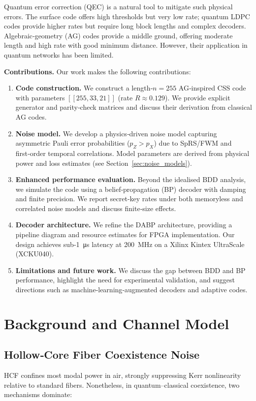 \documentclass[conference]{IEEEtran}
\begin{document}
Quantum error correction (QEC) is a natural tool to mitigate such physical errors.  The surface code offers high thresholds but very low rate; quantum LDPC codes provide higher rates but require long block lengths and complex decoders.  Algebraic‑geometry (AG) codes provide a middle ground, offering moderate length and high rate with good minimum distance.  However, their application in quantum networks has been limited.

\textbf{Contributions.} Our work makes the following contributions:

\begin{enumerate}[leftmargin=*,itemsep=1pt,topsep=2pt]
  \item \textbf{Code construction.}  We construct a length‑$n=255$ AG‑inspired CSS code with parameters $[[255,33,21]]$ (rate $R\approx 0.129$).  We provide explicit generator and parity‑check matrices and discuss their derivation from classical AG codes.
  \item \textbf{Noise model.}  We develop a physics‑driven noise model capturing asymmetric Pauli error probabilities ($p_Z>p_X$) due to SpRS/FWM and first‑order temporal correlations.  Model parameters are derived from physical power and loss estimates (see Section \ref{sec:noise_models}).
  \item \textbf{Enhanced performance evaluation.}  Beyond the idealised BDD analysis, we simulate the code using a belief‑propagation (BP) decoder with damping and finite precision.  We report secret‑key rates under both memoryless and correlated noise models and discuss finite‑size effects.
  \item \textbf{Decoder architecture.}  We refine the DABP architecture, providing a pipeline diagram and resource estimates for FPGA implementation.  Our design achieves sub‑\SI{1}{\micro\second} latency at \SI{200}{\mega\hertz} on a Xilinx Kintex UltraScale (XCKU040).
  \item \textbf{Limitations and future work.}  We discuss the gap between BDD and BP performance, highlight the need for experimental validation, and suggest directions such as machine‑learning‑augmented decoders and adaptive codes.
\end{enumerate}

\section{Background and Channel Model}\label{sec:background}

\subsection{Hollow‑Core Fiber Coexistence Noise}
HCF confines most modal power in air, strongly suppressing Kerr nonlinearity relative to standard fibers.  Nonetheless, in quantum–classical coexistence, two mechanisms dominate:
\end{document}
